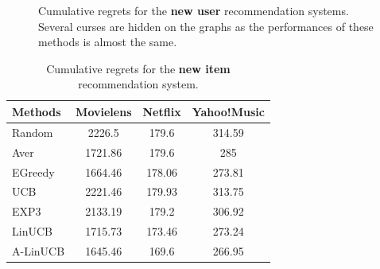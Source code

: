 \documentclass[twoside,leqno,twocolumn]{article}
\begin{document}
\begin{figure}[ht!]
  \centering
  \begin{center}
  \end{center}
  \caption{Cumulative regrets for the \textbf{new user} recommendation systems. Several curses are hidden on the graphs as the performances of these methods is almost the same.}
  \label{fig:newUser}
\end{figure}

\begin{table}
  \caption{Cumulative regrets for the \textbf{new item} recommendation system.}
  \centering
  \begin{tabular}{|l|c|c|c|}
    \hline
    Methods & Movielens & Netflix & Yahoo!Music \\
    \hline
    Random & 2226.5 & 179.6 & 314.59\\
    \hline
    Aver & 1721.86 & 179.6 & 285 \\
    \hline
    EGreedy & 1664.46 & 178.06 & 273.81 \\
    \hline  
    UCB & 2221.46 & 179.93 & 313.75 \\
    \hline
    EXP3 & 2133.19 & 179.2 & 306.92 \\
    \hline
     LinUCB & 1715.73 & 173.46 & 273.24 \\
    \hline
    A-LinUCB & 1645.46 & 169.6 & 266.95 \\
    \hline
  \end{tabular}
  \label{table:newItem}
\end{table}
\end{document}
